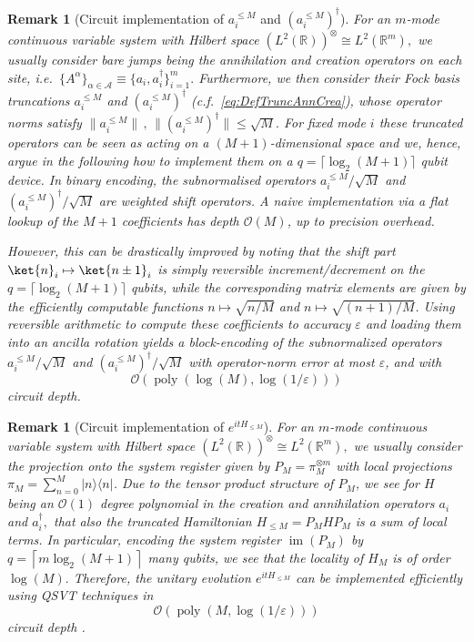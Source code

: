 \documentclass[11pt]{amsart}
\newcommand{\1}{\mathbbm{1}}
\newcommand{\ceil}[1]{\left\lceil {#1} \right\rceil}
\newcommand{\kb}[1]{|#1\rangle\!\langle#1|}
\newcommand{\R}{\mathbb{R}}
\newcommand{\eps}{\varepsilon}
\newcommand{\cA}{\mathcal{A}}
\theoremstyle{plain}
\newtheorem{remark}[theorem]{Remark}
\theoremstyle{definition}
\theoremstyle{remark}
\numberwithin{equation}{section}
\begin{document}
\begin{remark}[Circuit implementation of \(a_i^{\le M}\) and \((a_i^{\le M})^\dagger\)]
\label{rem:CircuitTruncJumps}
For an $m$-mode continuous variable system with Hilbert space $(L^2(\R))^\otimes \cong L^2(\R^m),$ we usually consider bare jumps being the annihilation and creation operators on each site, i.e.~$\{A^\alpha\}_{\alpha\in\cA} \equiv \{a_i,a^\dagger_i\}_{i=1}^{m}.$ Furthermore, we then consider their Fock basis truncations $a_i^{\le M}$ and $\left(a_i^{\le M}\right)^\dagger$ (c.f.~\eqref{eq:DefTruncAnnCrea}), whose operator norms satisfy $\|a^{\le M}_i\|\,,\, \|(a^{\le M}_i)^\dagger\|\le \sqrt{M}.$
For fixed mode $i$ these truncated operators can be seen as acting on a $(M+1)$-dimensional space and we, hence, argue in the following how to implement them on a \(q=\lceil \log_2(M+1)\rceil\) qubit device. In binary encoding, the  subnormalised operators
\(a_i^{\le M}/\sqrt{M}\) and \((a_i^{\le M})^\dagger/\sqrt{M}\) are weighted shift operators. A naive
implementation via a flat lookup of the \(M+1\) coefficients has depth
\(\mathcal O(M)\), up to precision overhead. 

However, this can be drastically improved
by noting that the shift part \(\ket{n}_i \mapsto \ket{n\pm1}_i\) is simply reversible
increment/decrement on the \(q=\lceil \log_2(M+1)\rceil\) qubits, while the corresponding
matrix elements are given by the efficiently computable functions
\(n\mapsto \sqrt{ n/M}\) and \(n\mapsto \sqrt{(n+1)/M}\). Using reversible arithmetic to compute
these coefficients to accuracy \(\varepsilon\) and loading them into an ancilla rotation
yields a block-encoding of the subnormalized operators
\(a_i^{\le M}/\sqrt M\) and \((a_i^{\le M})^\dagger/\sqrt M\) with operator-norm error at
most \(\varepsilon\), and with $$\mathcal{O}\left(\operatorname{poly}(\log(M),\log(1/\eps))\right)$$ circuit depth.
\end{remark}

\begin{remark}[Circuit implementation of $e^{itH_{\le M}}$] 
For an $m$-mode continuous variable system with Hilbert space $(L^2(\R))^\otimes \cong L^2(\R^m),$ we usually consider the projection onto the system register given by $P_M = \pi^{\otimes m}_M$ with local projections $\pi_M = \sum_{n=0}^{M} \kb{n}$. Due to the tensor product structure of $P_M$, we see for $H$ being an $\mathcal{O}(1)$ degree polynomial in the creation and annihilation operators $a_i$ and $a^\dagger_i,$ that also the truncated Hamiltonian $H_{\le M} = P_MHP_M$ is a sum of local terms. In particular, encoding the system register $\operatorname{im}(P_M)$ by $q=\ceil{m\log_2(M+1)}$ many qubits, we see that the locality of $H_M$ is of order $\log(M).$ Therefore, the unitary evolution $e^{itH_{\le M}}$ can be implemented efficiently using QSVT techniques in $$\mathcal{O}\left(\operatorname{poly}(M,\log(1/\eps))\right)$$ circuit depth
\label{rem:CircuitTruncHam}
\cite{Low_2017,low2017hamiltoniansimulationuniformspectral,Low2019hamiltonian,PhysRevX.6.041067,10.1145/3313276.3316366}.
\end{remark}
\end{document}
